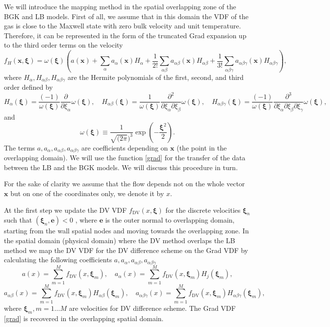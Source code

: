 \documentclass[]{elsarticle} %
\newcommand{\bxi}{\boldsymbol{\xi}}
\newcommand{\bx}{\boldsymbol{x}}
\begin{document}
{We will introduce the mapping method in the spatial overlapping zone of the BGK and LB models.
First of all, we assume that in this domain the VDF of the gas is close to the Maxwell state with zero bulk velocity and unit temperature.
Therefore, it can be represented in the form of the truncated Grad expansion up to the third order terms on the velocity
\begin{equation}\label{grad}
    f_H(\bx,\bxi) = \omega(\bxi)\left(a(\bx) +\sum_{\alpha}a_{\alpha}(\bx)H_{\alpha}+\frac{1}{2!}\sum_{\alpha\beta}a_{\alpha \beta}(\bx)H_{\alpha\beta}+\frac{1}{3!}\sum_{\alpha\beta \gamma}a_{\alpha\beta\gamma}(\bx)H_{\alpha\beta\gamma}\right),
\end{equation}
where $H_{\alpha}, H_{\alpha\beta}, H_{\alpha\beta\gamma}$ are the Hermite polynomials of the first, second, and third order defined by
$$
H_\alpha(\bxi)=\frac{(-1)}{\omega(\bxi)}\frac{\partial}{\partial \xi_\alpha}\omega(\bxi),  \quad H_{\alpha\beta}(\bxi)=\frac{1}{\omega(\bxi)}\frac{\partial^2}{\partial \xi_\alpha\partial \xi_\beta}\omega(\bxi),
\quad H_{\alpha\beta \gamma}(\bxi)=\frac{(-1)}{\omega(\bxi)}\frac{\partial^3}{\partial \xi_\alpha\partial \xi_\beta \partial \xi_\gamma}\omega(\bxi),
$$
and
$$
 \omega(\bxi)\equiv \frac{1}{\sqrt{(2\pi})^3}\exp\left(-\frac{\bxi^2}{2}\right).
$$
 The terms $a, a_{\alpha},a_{\alpha\beta}, a_{\alpha\beta \gamma}$ are coefficients depending on $\bx$ (the point in the overlapping domain).
 We will use the function \eqref{grad} for the transfer of the data between the LB and the BGK models. We will discuss this procedure in turn.

For the sake of clarity we assume that the flow depends not on the whole vector $\bx$ but on one of the coordinates only, we denote it by $x$.

At the first step we update the DV VDF $f_\mathrm{DV}(x,\bxi)$ for the discrete velocities $\bxi_n$ such that $(\bxi_n,\mathbf{e})<0$ , where $\mathbf{e}$ is the outer normal to overlapping domain,  starting from the wall spatial nodes and moving towards the overlapping zone.
In the spatial domain (physical domain) where the DV method overlaps the LB method we map the DV VDF for the DV difference scheme on the Grad VDF by calculating the following coefficients $a, a_\alpha,a_{\alpha\beta}, a_{\alpha\beta \gamma}$
$$
a(x)=\sum_{m=1}^M f_\mathrm{DV}(x,\bxi_m),   \quad a_\alpha(x)=\sum_{m=1}^Mf_\mathrm{DV}(x,\bxi_m)H_j(\bxi_m),
$$
$$
a_{\alpha\beta }(x)=\sum_{m=1}^Mf_\mathrm{DV}(x,\bxi_m)H_{\alpha\beta}(\bxi_m), \quad
a_{\alpha\beta \gamma}(x)=\sum_{m=1}^Mf_\mathrm{DV}(x,\bxi_m)H_{\alpha\beta \gamma}(\bxi_m),
$$
where $\bxi_m, m=1 \ldots M$ are velocities for DV difference scheme.
The Grad VDF \eqref{grad} is recovered in the overlapping spatial domain.

}
\end{document}
